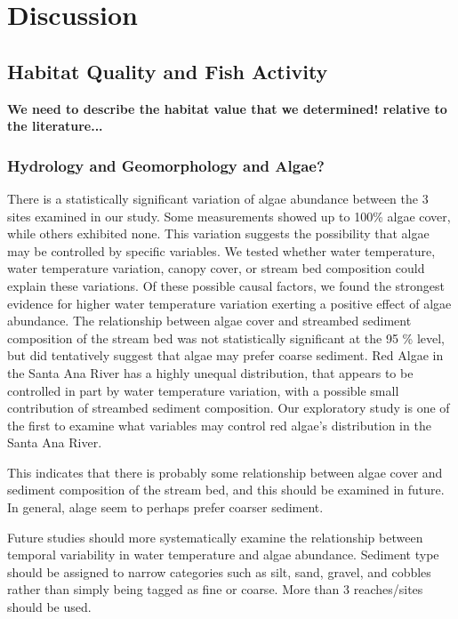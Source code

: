 \documentclass{article}\usepackage[]{graphicx}\usepackage[]{color}
\begin{document}
\section{Discussion}

\subsection{Habitat Quality and Fish Activity}

\textbf{We need to describe the habitat value that we determined! relative to the literature...}

\subsubsection{Hydrology and Geomorphology and Algae?}

There is a statistically significant variation of algae abundance between the 3 sites examined in our study. Some measurements showed up to 100\% algae cover, while others exhibited none. This variation suggests the possibility that algae may be controlled by specific variables. We tested whether water temperature, water temperature variation, canopy cover, or stream bed composition could explain these variations. Of these possible causal factors, we found the strongest evidence for higher water temperature variation exerting a positive effect of algae abundance. The relationship between algae cover and streambed sediment composition of the stream bed was not statistically significant at the 95 \% level, but did tentatively suggest that algae may prefer coarse sediment. Red Algae in the Santa Ana River has a highly unequal distribution, that appears to be controlled in part by water temperature variation, with a possible small contribution of streambed sediment composition. 
Our exploratory study is one of the first to examine what variables may control red algae's distribution in the Santa Ana River. 

This indicates that there is probably some relationship between algae cover and sediment composition of the stream bed, and this should be examined in future. In general, alage seem to perhaps prefer coarser sediment. 

Future studies should more systematically examine the relationship between temporal variability in water temperature and algae abundance. Sediment type should be assigned to narrow categories such as silt, sand, gravel, and cobbles rather than simply being tagged as fine or coarse. More than 3 reaches/sites should be used. 
\end{document}
